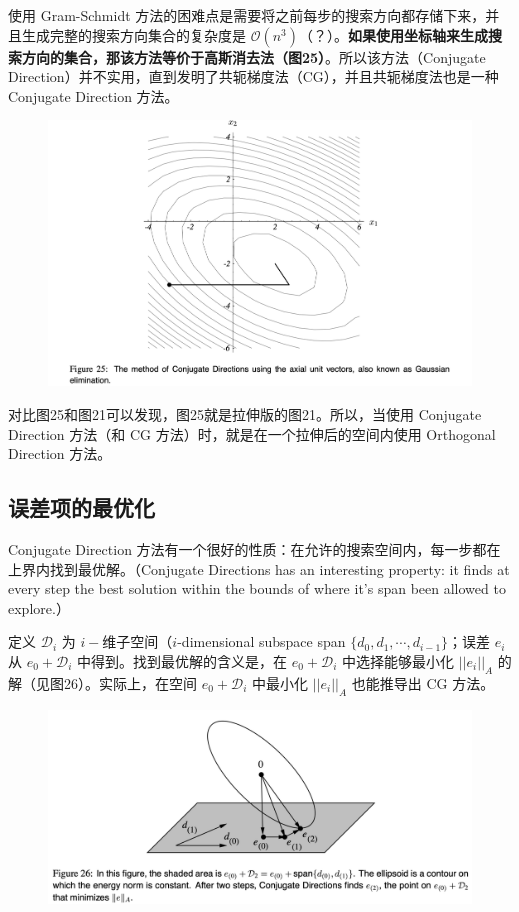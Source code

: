 \documentclass[12pt]{article}
\begin{document}
使用 Gram-Schmidt 方法的困难点是需要将之前每步的搜索方向都存储下来，并且生成完整的搜索方向集合的复杂度是 $\mathcal{O}(n^3)$（？）。\textbf{如果使用坐标轴来生成搜索方向的集合，那该方法等价于高斯消去法（图25）}。所以该方法（Conjugate Direction）并不实用，直到发明了共轭梯度法（CG），并且共轭梯度法也是一种 Conjugate Direction 方法。
\begin{figure}[H]
    \centering
    \includegraphics[width=1\textwidth]{fig/CG_Convergence_CD_4.png}
\end{figure}

对比图25和图21可以发现，图25就是拉伸版的图21。所以，当使用 Conjugate Direction 方法（和 CG 方法）时，就是在一个拉伸后的空间内使用 Orthogonal Direction 方法。

\subsection{误差项的最优化}
Conjugate Direction 方法有一个很好的性质：在允许的搜索空间内，每一步都在上界内找到最优解。（Conjugate Directions has an interesting property: it ﬁnds at every step the best solution within the bounds of where it’s span been allowed to explore.）

定义 $\mathcal{D}_i$ 为 $i-$维子空间（$i$-dimensional subspace span $\{d_0, d_1, \cdots, d_{i-1}\}$；误差 $e_i$ 从 $e_0 + \mathcal{D}_i$ 中得到。找到最优解的含义是，在 $e_0 + \mathcal{D}_i$ 中选择能够最小化 $||e_i||_A$ 的解（见图26）。实际上，在空间 $e_0 + \mathcal{D}_i$ 中最小化  $||e_i||_A$ 也能推导出 CG 方法。
\begin{figure}[H]
    \centering
    \includegraphics[width=1\textwidth]{fig/CG_Convergence_CD_5.png}
\end{figure}
\end{document}
